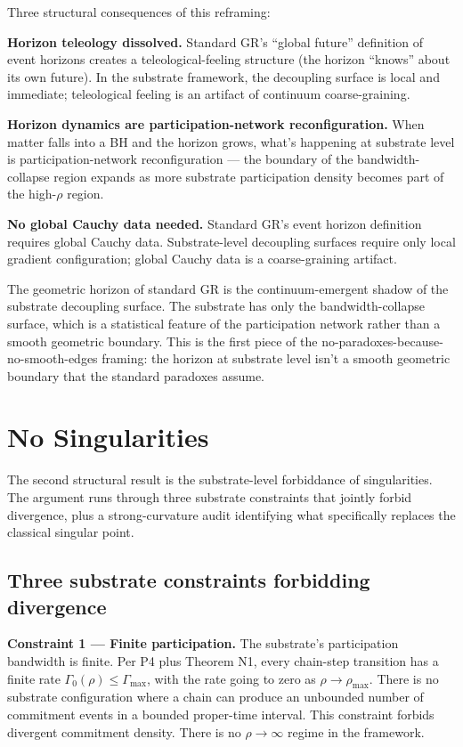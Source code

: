 \documentclass[11pt,a4paper]{article}
\begin{document}
Three structural consequences of this reframing:

\textbf{Horizon teleology dissolved.} Standard GR's ``global future'' definition of event horizons creates a teleological-feeling structure (the horizon ``knows'' about its own future). In the substrate framework, the decoupling surface is local and immediate; teleological feeling is an artifact of continuum coarse-graining.

\textbf{Horizon dynamics are participation-network reconfiguration.} When matter falls into a BH and the horizon grows, what's happening at substrate level is participation-network reconfiguration --- the boundary of the bandwidth-collapse region expands as more substrate participation density becomes part of the high-$\rho$ region.

\textbf{No global Cauchy data needed.} Standard GR's event horizon definition requires global Cauchy data. Substrate-level decoupling surfaces require only local gradient configuration; global Cauchy data is a coarse-graining artifact.

The geometric horizon of standard GR is the continuum-emergent shadow of the substrate decoupling surface. The substrate has only the bandwidth-collapse surface, which is a statistical feature of the participation network rather than a smooth geometric boundary. This is the first piece of the no-paradoxes-because-no-smooth-edges framing: the horizon at substrate level isn't a smooth geometric boundary that the standard paradoxes assume.

\section{No Singularities}

The second structural result is the substrate-level forbiddance of singularities. The argument runs through three substrate constraints that jointly forbid divergence, plus a strong-curvature audit identifying what specifically replaces the classical singular point.

\subsection{Three substrate constraints forbidding divergence}

\textbf{Constraint 1 --- Finite participation.} The substrate's participation bandwidth is finite. Per P4 plus Theorem N1, every chain-step transition has a finite rate $\Gamma_0(\rho) \leq \Gamma_{\mathrm{max}}$, with the rate going to zero as $\rho \to \rho_{\mathrm{max}}$. There is no substrate configuration where a chain can produce an unbounded number of commitment events in a bounded proper-time interval. This constraint forbids divergent commitment density. There is no $\rho \to \infty$ regime in the framework.
\end{document}
